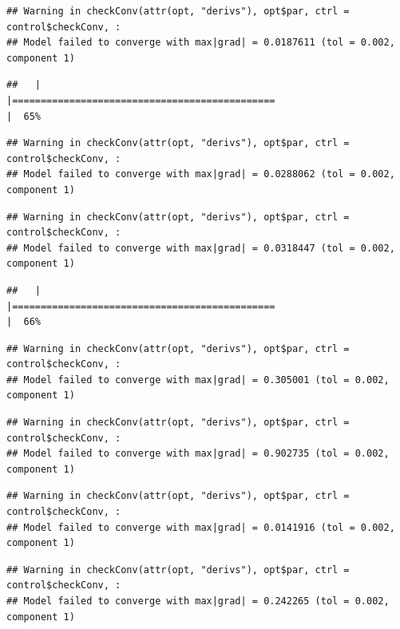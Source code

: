 \documentclass[
  12pt,
]{book}
\begin{document}
\begin{verbatim}
## Warning in checkConv(attr(opt, "derivs"), opt$par, ctrl = control$checkConv, :
## Model failed to converge with max|grad| = 0.0187611 (tol = 0.002, component 1)
\end{verbatim}

\begin{verbatim}
##   |                                                                              |==============================================                        |  65%
\end{verbatim}

\begin{verbatim}
## Warning in checkConv(attr(opt, "derivs"), opt$par, ctrl = control$checkConv, :
## Model failed to converge with max|grad| = 0.0288062 (tol = 0.002, component 1)
\end{verbatim}

\begin{verbatim}
## Warning in checkConv(attr(opt, "derivs"), opt$par, ctrl = control$checkConv, :
## Model failed to converge with max|grad| = 0.0318447 (tol = 0.002, component 1)
\end{verbatim}

\begin{verbatim}
##   |                                                                              |==============================================                        |  66%
\end{verbatim}

\begin{verbatim}
## Warning in checkConv(attr(opt, "derivs"), opt$par, ctrl = control$checkConv, :
## Model failed to converge with max|grad| = 0.305001 (tol = 0.002, component 1)
\end{verbatim}

\begin{verbatim}
## Warning in checkConv(attr(opt, "derivs"), opt$par, ctrl = control$checkConv, :
## Model failed to converge with max|grad| = 0.902735 (tol = 0.002, component 1)
\end{verbatim}

\begin{verbatim}
## Warning in checkConv(attr(opt, "derivs"), opt$par, ctrl = control$checkConv, :
## Model failed to converge with max|grad| = 0.0141916 (tol = 0.002, component 1)
\end{verbatim}

\begin{verbatim}
## Warning in checkConv(attr(opt, "derivs"), opt$par, ctrl = control$checkConv, :
## Model failed to converge with max|grad| = 0.242265 (tol = 0.002, component 1)
\end{verbatim}
\end{document}

